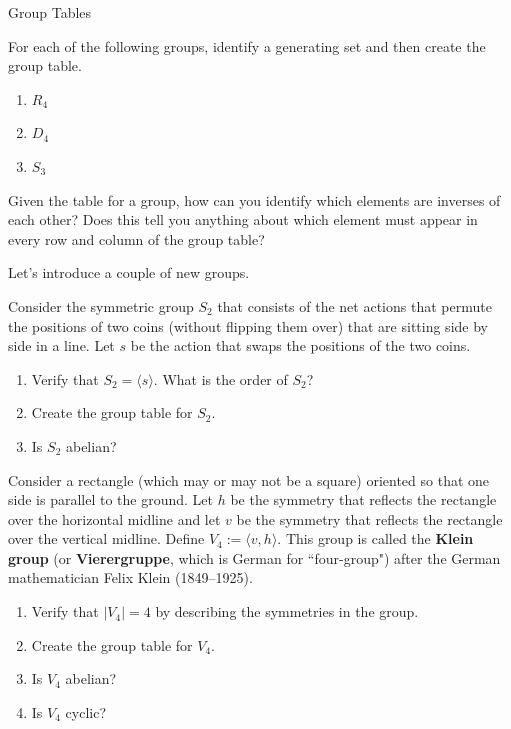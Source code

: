 \begin{section}{Group Tables}
\begin{problem}
For each of the following groups, identify a generating set and then create the group table.
\begin{enumerate}[label=\rm{(\alph*)}]
\item $R_4$
\item $D_4$
\item $S_3$
\end{enumerate}
\end{problem}

\begin{problem}
Given the table for a group, how can you identify which elements are inverses of each other?  Does this tell you anything about which element must appear in every row and column of the group table?
\end{problem}

Let's introduce a couple of new groups.

\begin{problem}\label{prob:introducing_S2}
Consider the symmetric group $S_2$ that consists of the net actions that permute the positions of two coins (without flipping them over) that are sitting side by side in a line.  Let $s$ be the action that swaps the positions of the two coins.
\begin{enumerate}[label=\rm{(\alph*)}]
\item Verify that $S_2=\langle s\rangle$. What is the order of $S_2$?
\item Create the group table for $S_2$.
\item Is $S_2$ abelian?
\end{enumerate}
\end{problem}

\begin{problem}\label{prob:introducing_V4}
Consider a rectangle (which may or may not be a square) oriented so that one side is parallel to the ground.  Let $h$ be the symmetry that reflects the rectangle over the horizontal midline and let $v$ be the symmetry that reflects the rectangle over the vertical midline. Define $V_4:=\langle v, h\rangle$. This group is called the \textbf{Klein group} (or \textbf{Vierergruppe}, which is German for ``four-group") after the German mathematician Felix Klein (1849--1925).
\begin{enumerate}[label=\rm{(\alph*)}]
\item Verify that $|V_4|=4$ by describing the symmetries in the group.
\item Create the group table for $V_4$.
\item Is $V_4$ abelian?
\item Is $V_4$ cyclic?
\end{enumerate}
\end{problem}


\end{section}
